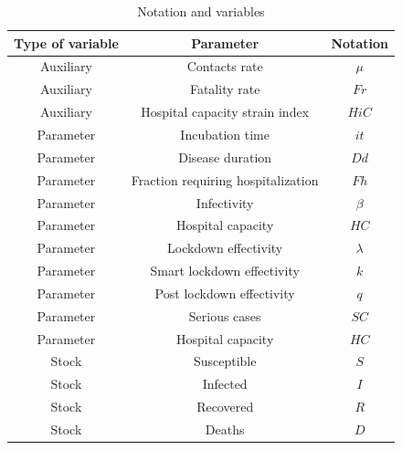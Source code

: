 \documentclass[12pt,a4paper,english]{article}
\begin{document}
    \begin{table}[h!]
        \begin{center}
            \begin{tabular}{|c|c|c|}
                \hline
                Type of variable & Parameter & Notation \\
                \hline
                Auxiliary & Contacts rate                      & $\mu$  \\
                Auxiliary & Fatality rate                      & $Fr$ \\
                Auxiliary & Hospital capacity strain index     & $HiC$ \\
                Parameter & Incubation time                    & $it$ \\
                Parameter & Disease duration                   & $Dd$ \\
                Parameter & Fraction requiring hospitalization & $Fh$ \\
                Parameter & Infectivity                        & $\beta$ \\
                Parameter & Hospital capacity                  & $HC$ \\
                Parameter & Lockdown effectivity               & $\lambda$ \\
                Parameter & Smart lockdown effectivity         & $k$ \\
                Parameter & Post lockdown effectivity          & $q$ \\
                Parameter & Serious cases                      & $SC$  \\
                Parameter & Hospital capacity                  & $HC$ \\
                Stock     & Susceptible                        & $S$ \\
                Stock     & Infected                           & $I$ \\
                Stock     & Recovered                          & $R$ \\
                Stock     & Deaths                             & $D$ \\
                \hline
            \end{tabular}
        \end{center}
        \caption{Notation and variables \cite{math_article}}
        \label{tab:not_var}
    \end{table}
\end{document}
